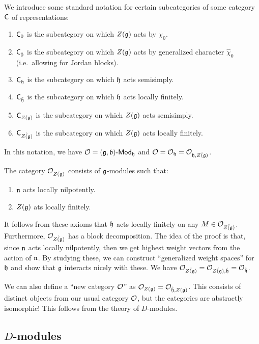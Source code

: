 \documentclass{article}
\begin{document}
We introduce some standard notation for certain subcategories of some category $\mathsf{C}$ of representations:
\begin{enumerate}
	\item $\mathsf{C}_0$ is the subcategory on which $Z(\mathfrak{g})$ acts by $\chi_0$.
	\item $\mathsf{C}_{\hat{0}}$ is the subcategory on which $Z(\mathfrak{g})$ acts by generalized character $\hat{\chi}_0$ (i.e.\ allowing for Jordan blocks).
	\item $\mathsf{C}_{\mathfrak{h}}$ is the subcategory on which $\mathfrak{h}$ acts semisimply.
	\item $\mathsf{C}_{\hat{\mathfrak{h}}}$ is the subcategory on which $\mathfrak{h}$ acts locally finitely.
	\item $\mathsf{C}_{Z(\mathfrak{g})}$ is the subcategory on which $Z(\mathfrak{g})$ acts semisimply.
	\item $\mathsf{C}_{\hat{Z(\mathfrak{g})}}$ is the subcategory on which $Z(\mathfrak{g})$ acts locally finitely.
\end{enumerate}

In this notation, we have $\mathcal{O} = (\mathfrak{g}, \mathfrak{b})\text{-}\mathsf{Mod}_{\mathfrak{h}}$ and $\mathcal{O} = \mathcal{O}_{\mathfrak{h}} = \mathcal{O}_{\mathfrak{h},\hat{Z(\mathfrak{g})}}$.

\begin{dfn}
	The category $\mathcal{O}_{\hat{Z(\mathfrak{g})}}$ consists of $\mathfrak{g}$-modules such that:
	\begin{enumerate}
		\item $\mathfrak{n}$ acts locally nilpotently.
		\item $Z(\mathfrak{g})$ ats locally finitely.
	\end{enumerate}
\end{dfn}

It follows from these axioms that $\mathfrak{h}$ acts locally finitely on any $M \in \mathcal{O}_{\hat{Z(\mathfrak{g})}}$.
Furthermore, $\mathcal{O}_{\hat{Z(\mathfrak{g})}}$ has a block decomposition.
The idea of the proof is that, since $\mathfrak{n}$ acts locally nilpotently, then we get highest weight vectors from the action of $\mathfrak{n}$.
By studying these, we can construct ``generalized weight spaces'' for $\mathfrak{h}$ and show that $\mathfrak{g}$ interacts nicely with these.
We have $\mathcal{O}_{\hat{Z(\mathfrak{g})}} = \mathcal{O}_{\hat{Z(\mathfrak{g})},\hat{\mathfrak{h}}} = \mathcal{O}_{\hat{\mathfrak{h}}}$.

We can also define a ``new category $\mathcal{O}$'' as $\mathcal{O}_{Z(\mathfrak{g})} = \mathcal{O}_{\hat{\mathfrak{h}},Z(\mathfrak{g})}$.
This consists of distinct objects from our usual category $\mathcal{O}$, but the categories are abstractly isomorphic!
This follows from the theory of $D$-modules.

\subsection{$D$-modules}
\end{document}
